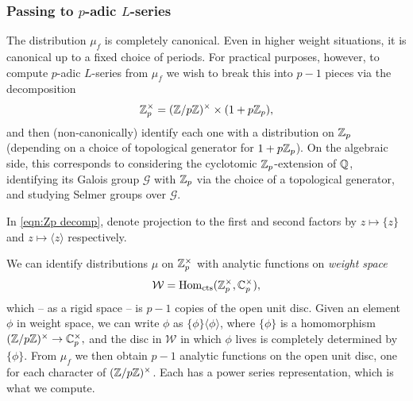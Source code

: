 \documentclass[a4paper,11pt]{article}
\newcommand{\W}{\mathcal{W}}
\numberwithin{equation}{section}
\begin{document}
\subsubsection{Passing to $p$-adic $L$-series}
The distribution $\mu_f$ is completely canonical. Even in higher weight situations, it is canonical up to a fixed choice of periods. For practical purposes, however, to compute $p$-adic $L$-series from $\mu_f$ we wish to break this into $p-1$ pieces via the decomposition 
\begin{equation}\label{eqn:Zp decomp}
	\mathbb{Z}_p^\times = (\mathbb{Z}/p\mathbb{Z})^\times \times (1+p\mathbb{Z}_p),
\end{equation}
 and then (non-canonically) identify each one with a distribution on $\mathbb{Z}_p$ (depending on a choice of topological generator for $1+p\mathbb{Z}_p$). On the algebraic side, this corresponds to considering the cyclotomic $\mathbb{Z}_p$-extension of $\mathbb{Q}$, identifying its Galois group $\mathcal{G}$ with $\mathbb{Z}_p$ via the choice of a topological generator, and studying Selmer groups over $\mathcal{G}$.


\begin{notation}
	In \eqref{eqn:Zp decomp}, denote projection to the first and second factors by $z \mapsto \{z\}$ and $z \mapsto \langle z\rangle$ respectively. 
\end{notation}

We can identify distributions $\mu$ on $\mathbb{Z}_p^\times$ with analytic functions on \emph{weight space} 
\[
	\W = \mathrm{Hom}_{\mathrm{cts}}(\Zp^\times, \C_p^\times),
\]
 which -- as a rigid space -- is $p-1$ copies of the open unit disc. Given an element $\phi$ in weight space, we can write $\phi$ as $\{\phi\}\langle\phi\rangle$, where $\{\phi\}$ is a homomorphism $(\mathbb{Z}/p\mathbb{Z})^\times \rightarrow \mathbb{C}_p^\times,$ and the disc in $\W$ in which $\phi$ lives is completely determined by $\{\phi\}$. From $\mu_f$ we then obtain $p-1$ analytic functions on the open unit disc, one for each character of $(\mathbb{Z}/p\mathbb{Z})^\times$. Each has a power series representation, which is what we compute.
\end{document}
